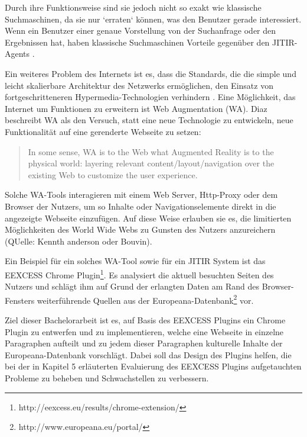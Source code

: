 Durch ihre Funktionsweise sind sie jedoch nicht so exakt wie klassische Suchmaschinen, da sie nur `erraten` können, was den Benutzer gerade interessiert. Wenn ein Benutzer einer genaue Vorstellung von der Suchanfrage oder den Ergebnissen hat, haben klassische Suchmaschinen Vorteile gegenüber den JITIR-Agents \cite{rhodes2000just}.

Ein weiteres Problem des Internets ist es, dass die Standards, die die simple und leicht skalierbare Architektur des Netzwerks ermöglichen, den Einsatz von fortgeschritteneren Hypermedia-Technologien verhindern \cite{bouvin1999unifying}. Eine Möglichkeit, das Internet um Funktionen zu erweitern ist Web Augmentation (WA). Diaz \cite{diaz2012understanding} beschreibt WA als den Versuch, statt eine neue Technologie zu entwickeln, neue Funktionalität auf eine gerenderte Webseite zu setzen:
\begin{quote}
In some sense, WA is to the Web what Augmented Reality is to the physical world: layering relevant content/layout/navigation over the existing Web to customize the user experience. \cite{diaz2012understanding}
\end{quote}
Solche WA-Tools interagieren mit einem Web Server, Http-Proxy oder dem Browser der Nutzers, um so Inhalte oder Navigationselemente direkt in die angezeigte Webseite einzufügen. Auf diese Weise erlauben sie es, die limitierten Möglichkeiten des World Wide Webs zu Gunsten des Nutzers anzureichern (QUelle: Kennth anderson oder Bouvin).

Ein Beispiel für ein solches WA-Tool sowie für ein JITIR System ist das EEXCESS Chrome Plugin\footnote{http://eexcess.eu/results/chrome-extension/}. Es analysiert die aktuell besuchten Seiten des Nutzers und schlägt ihm auf Grund der erlangten Daten am Rand des Browser-Fensters weiterführende Quellen aus der Europeana-Datenbank\footnote{http://www.europeana.eu/portal/} vor.

Ziel dieser Bachelorarbeit ist es, auf Basis des EEXCESS Plugins ein Chrome Plugin zu entwerfen und zu implementieren, welche eine Webseite in einzelne Paragraphen aufteilt und zu jedem dieser Paragraphen kulturelle Inhalte der Europeana-Datenbank vorschlägt. Dabei soll das Design des Plugins helfen, die bei der in Kapitel 5 erläuterten Evaluierung des EEXCESS Plugins aufgetauchten Probleme zu beheben und Schwachstellen zu verbessern.